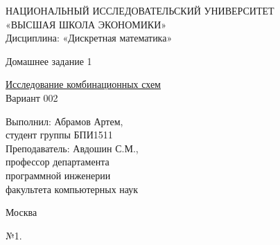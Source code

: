 \documentclass[a4paper,10pt]{report} %
\begin{document}
\begin{titlepage}
\newpage

\begin{center}
{\large НАЦИОНАЛЬНЫЙ ИССЛЕДОВАТЕЛЬСКИЙ УНИВЕРСИТЕТ \\
«ВЫСШАЯ ШКОЛА ЭКОНОМИКИ» 							\\
Дисциплина: «Дискретная математика»}

\vfill %

{\large Домашнее задание 1}

\bigskip

\underline{Исследование комбинационных схем}\\
Вариант 002

\vfill

\begin{flushright}
Выполнил: Абрамов Артем,\\
студент группы БПИ1511\medskip \\
Преподаватель: Авдошин С.М., \\
профессор департамента \\
программной инженерии \\
факультета компьютерных наук
\end{flushright}

\vfill

Москва \number\year

\end{center}
\end{titlepage}

\newpage

\begin{center}
№1.\\
\end{center}
\end{document}
